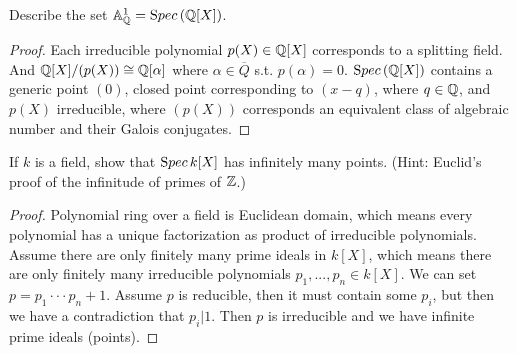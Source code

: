 \documentclass[11pt,fleqn]{book}
\begin{document}
\begin{exr}
Describe the set $\mathbb A^1_\mathbb Q={\text Spec\,}(\mathbb Q[X])$.
\end{exr}
\begin{proof}
Each irreducible polynomial $p(X)\in\mathbb Q[X]$ corresponds to a splitting field. And $\mathbb Q[X]/(p(X))\cong \mathbb Q[\alpha]$ where $\alpha\in\overline{Q}$ s.t. $p(\alpha)=0$. ${\text Spec\,}(\mathbb Q[X])$ contains a generic point $(0)$, closed point corresponding to $(x-q)$, where $q\in\mathbb Q$, and $p(X)$ irreducible, where $(p(X))$ corresponds an equivalent class of algebraic number and their Galois conjugates. 
\end{proof}

\begin{exr}
If $k$ is a field, show that ${\text Spec\,} k[X]$ has infinitely many points. (Hint: Euclid’s proof of the infinitude of primes of $\mathbb Z$.)
\end{exr}
\begin{proof}
Polynomial ring over a field is Euclidean domain, which means every polynomial has a unique factorization as product of irreducible polynomials. Assume there are only finitely many prime ideals in $k[X]$, which means there are only finitely many irreducible polynomials $p_1,...,p_n\in k[X]$. We can set $p=p_1\cdot\cdot\cdot p_n+1$. Assume $p$ is reducible, then it must contain some $p_i$, but then we have a contradiction that $p_i|1$. Then $p$ is irreducible and we have infinite prime ideals (points).
\end{proof}
\end{document}
